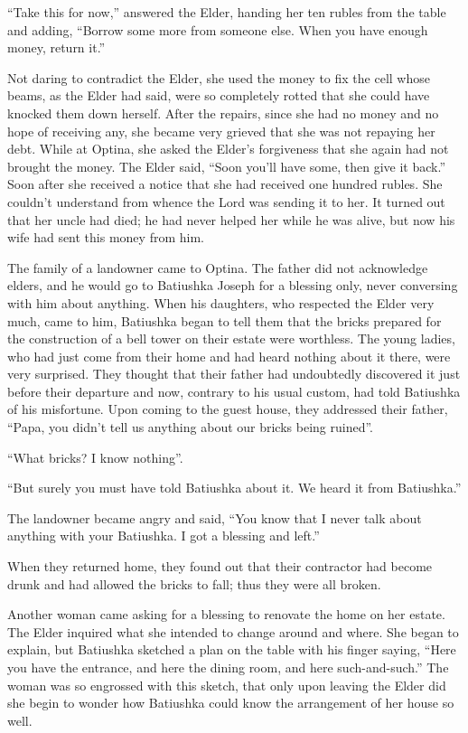 ``Take this for now,'' answered the Elder, handing her ten rubles from the table and adding, ``Borrow some more from someone else. When you have enough money, return it.''

Not daring to contradict the Elder, she used the money to fix the cell whose beams, as the Elder had said, were so completely rotted that she could have knocked them down herself. After the repairs, since she had no money and no hope of receiving any, she became very grieved that she was not repaying her debt. While at Optina, she asked the Elder's forgiveness that she again had not brought the money. The Elder said, ``Soon you'll have some, then give it back.'' Soon after she received a notice that she had received one hundred rubles. She couldn't understand from whence the Lord was sending it to her. It turned out that her uncle had died; he had never helped her while he was alive, but now his wife had sent this money from him.

The family of a landowner came to Optina. The father did not acknowledge elders, and he would go to Batiushka Joseph for a blessing only, never conversing with him about anything. When his daughters, who respected the Elder very much, came to him, Batiushka began to tell them that the bricks prepared for the construction of a bell tower on their estate were worthless. The young ladies, who had just come from their home and had heard nothing about it there, were very surprised. They thought that their father had undoubtedly discovered it just before their departure and now, contrary to his usual custom, had told Batiushka of his misfortune. Upon coming to the guest house, they addressed their father, ``Papa, you didn't tell us anything about our bricks being ruined''.

``What bricks? I know nothing''.

``But surely you must have told Batiushka about it. We heard it from Batiushka.''

The landowner became angry and said, ``You know that I never talk about anything with your Batiushka. I got a blessing and left.''

When they returned home, they found out that their contractor had become drunk and had allowed the bricks to fall; thus they were all broken.

Another woman came asking for a blessing to renovate the home on her estate. The Elder inquired what she intended to change around and where. She began to explain, but Batiushka sketched a plan on the table with his finger saying, ``Here you have the entrance, and here the dining room, and here such-and-such.'' The woman was so engrossed with this sketch, that only upon leaving the Elder did she begin to wonder how Batiushka could know the arrangement of her house so well.

